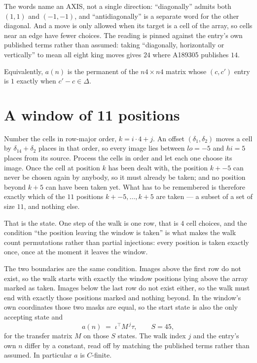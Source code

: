 \documentclass[11pt,a4paper]{article}
\theoremstyle{plain}
\theoremstyle{definition}
\begin{document}
The words name an AXIS, not a single direction: ``diagonally'' admits
both $(1,1)$ and $(-1,-1)$, and ``antidiagonally'' is a separate word for the other diagonal.
And a move is only allowed when its target is a cell of the array, so cells near an
edge have fewer choices. The reading is pinned against the entry's own published terms rather
than assumed: taking ``diagonally, horizontally or vertically'' to mean all eight king moves
gives $24$ where A189305 publishes $14$.

Equivalently, $a(n)$ is the permanent of the $n4\times n4$ matrix whose $(c,c')$ entry is
$1$ exactly when $c'-c\in\Delta$.

\section{A window of 11 positions}

Number the cells in row-major order, $k=i\cdot4+j$. An offset $(\delta_1,\delta_2)$ moves a
cell by $\delta_14+\delta_2$ places in that order, so every image lies between $lo=-5$ and
$hi=5$ places from its source. Process the cells in order and let each one choose its image.
Once the cell at position $k$ has been dealt with, the position $k+-5$ can never be chosen
again by anybody, so it must already be taken; and no position beyond $k+5$ can have been
taken yet. What has to be remembered is therefore exactly which of the $11$ positions
$k+-5,\dots,k+5$ are taken --- a subset of a set of size $11$, and nothing else.

That is the state. One step of the walk is one row, that is $4$ cell choices, and the
condition ``the position leaving the window is taken'' is what makes the walk count permutations
rather than partial injections: every position is taken exactly once, once at the moment it
leaves the window.

The two boundaries are the same condition. Images above the first row do not exist, so the walk
starts with exactly the window positions lying above the array marked as taken. Images below the
last row do not exist either, so the walk must end with exactly those positions marked and
nothing beyond. In the window's own coordinates those two masks are equal, so the start state is
also the only accepting state and
\[
a(n)\;=\;\iota^{\!\top}M^{\,j}\tau ,\qquad S=45,
\]
for the transfer matrix $M$ on those $S$ states. The walk index $j$ and the entry's own $n$
differ by a constant, read off by matching the published terms rather than assumed. In
particular $a$ is $C$-finite.
\end{document}
